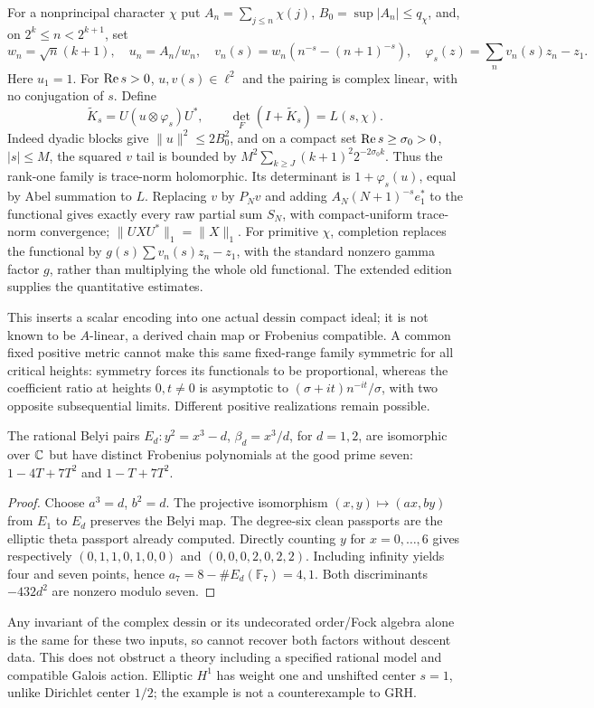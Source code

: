 For a nonprincipal character $\chi$ put $A_n=\sum_{j\le n}\chi(j)$, $B_0=\sup|A_n|\le q_\chi$, and, on $2^k\le n<2^{k+1}$, set
\[
 w_n=\sqrt n(k+1),\quad u_n=A_n/w_n,\quad
 v_n(s)=w_n(n^{-s}-(n+1)^{-s}),\quad
 \varphi_s(z)=\sum_n v_n(s)z_n-z_1.
\]
Here $u_1=1$. For $\operatorname{Re} s>0$, $u,v(s)\in\ell^2$ and the pairing is complex linear, with no conjugation of $s$. Define
\[
 \widetilde K_s=U(u\otimes\varphi_s)U^*,\qquad
 \det_F(I+\widetilde K_s)=L(s,\chi).
\]
Indeed dyadic blocks give $\|u\|^2\le2B_0^2$, and on a compact set $\operatorname{Re} s\ge\sigma_0>0$, $|s|\le M$, the squared $v$ tail is bounded by $M^2\sum_{k\ge J}(k+1)^2 2^{-2\sigma_0k}$. Thus the rank-one family is trace-norm holomorphic. Its determinant is $1+\varphi_s(u)$, equal by Abel summation to $L$. Replacing $v$ by $P_Nv$ and adding $A_N(N+1)^{-s}e_1^*$ to the functional gives exactly every raw partial sum $S_N$, with compact-uniform trace-norm convergence; $\|UXU^*\|_1=\|X\|_1$. For primitive $\chi$, completion replaces the functional by $g(s)\sum v_n(s)z_n-z_1$, with the standard nonzero gamma factor $g$, rather than multiplying the whole old functional. The extended edition supplies the quantitative estimates.

This inserts a scalar encoding into one actual dessin compact ideal; it is not known to be $A$-linear, a derived chain map or Frobenius compatible. A common fixed positive metric cannot make this same fixed-range family symmetric for all critical heights: symmetry forces its functionals to be proportional, whereas the coefficient ratio at heights $0,t\ne0$ is asymptotic to $(\sigma+it)n^{-it}/\sigma$, with two opposite subsequential limits. Different positive realizations remain possible.

\begin{proposition}\label{thm:descent}
The rational Belyi pairs $E_d:y^2=x^3-d$, $\beta_d=x^3/d$, for $d=1,2$, are isomorphic over $\mathbb C$ but have distinct Frobenius polynomials at the good prime seven: $1-4T+7T^2$ and $1-T+7T^2$.
\end{proposition}
\begin{proof}
Choose $a^3=d$, $b^2=d$. The projective isomorphism $(x,y)\mapsto(ax,by)$ from $E_1$ to $E_d$ preserves the Belyi map. The degree-six clean passports are the elliptic theta passport already computed. Directly counting $y$ for $x=0,\ldots,6$ gives respectively $(0,1,1,0,1,0,0)$ and $(0,0,0,2,0,2,2)$. Including infinity yields four and seven points, hence $a_7=8-\#E_d(\mathbb F_7)=4,1$. Both discriminants $-432d^2$ are nonzero modulo seven.
\end{proof}
Any invariant of the complex dessin or its undecorated order/Fock algebra alone is the same for these two inputs, so cannot recover both factors without descent data. This does not obstruct a theory including a specified rational model and compatible Galois action. Elliptic $H^1$ has weight one and unshifted center $s=1$, unlike Dirichlet center $1/2$; the example is not a counterexample to GRH.

